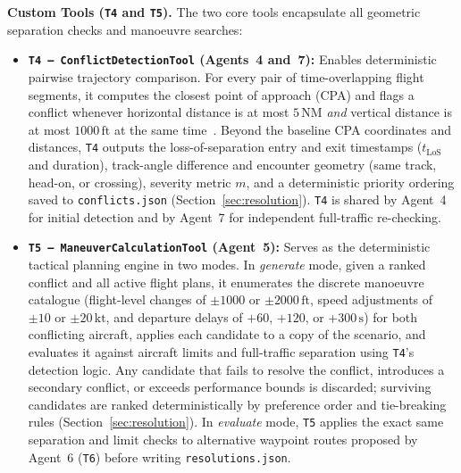 \textbf{Custom Tools (\texttt{T4} and \texttt{T5}).} The two core tools encapsulate all geometric separation checks and manoeuvre searches:
\begin{itemize}[leftmargin=*]
    \item \textbf{\texttt{T4 -- ConflictDetectionTool} (Agents~4 and~7):} Enables deterministic pairwise trajectory comparison. For every pair of time-overlapping flight segments, it computes the closest point of approach (CPA) and flags a conflict whenever horizontal distance is at most $5\,\text{NM}$ \emph{and} vertical distance is at most $1000\,\text{ft}$ at the same time~\cite{icao4444}. Beyond the baseline CPA coordinates and distances, \texttt{T4} outputs the loss-of-separation entry and exit timestamps ($t_{\text{LoS}}$ and duration), track-angle difference and encounter geometry (same track, head-on, or crossing), severity metric $m$, and a deterministic priority ordering saved to \texttt{conflicts.json} (Section~\ref{sec:resolution}). \texttt{T4} is shared by Agent~4 for initial detection and by Agent~7 for independent full-traffic re-checking.
    \item \textbf{\texttt{T5 -- ManeuverCalculationTool} (Agent~5):} Serves as the deterministic tactical planning engine in two modes. In \emph{generate} mode, given a ranked conflict and all active flight plans, it enumerates the discrete manoeuvre catalogue (flight-level changes of $\pm 1000$ or $\pm 2000\,\text{ft}$, speed adjustments of $\pm 10$ or $\pm 20\,\text{kt}$, and departure delays of $+60$, $+120$, or $+300\,\text{s}$) for both conflicting aircraft, applies each candidate to a copy of the scenario, and evaluates it against aircraft limits and full-traffic separation using \texttt{T4}'s detection logic. Any candidate that fails to resolve the conflict, introduces a secondary conflict, or exceeds performance bounds is discarded; surviving candidates are ranked deterministically by preference order and tie-breaking rules (Section~\ref{sec:resolution}). In \emph{evaluate} mode, \texttt{T5} applies the exact same separation and limit checks to alternative waypoint routes proposed by Agent~6 (\texttt{T6}) before writing \texttt{resolutions.json}.
\end{itemize}

